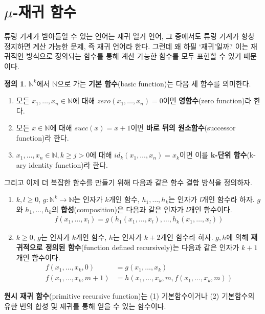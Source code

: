 \documentclass[b5paper, 11pt]{book}
\theoremstyle{definition}
\newtheorem{defn}{정의}[chapter]
\begin{document}
\section{$\mu$-재귀 함수} \label{mu-recursive}
튜링 기계가 받아들일 수 있는 언어는 재귀 열거 언어, 그 중에서도 튜링 기계가 항상 정지하면 계산 가능한 문제, 즉 재귀 언어라 한다. 그런데 왜 하필 `재귀'일까? 이는 재귀적인 방식으로 정의되는 함수를 통해 계산 가능한 함수를 모두 표현할 수 있기 때문이다.  
\begin{defn} \label{primitive recursive definition}
    $\mathbb{N}^k$에서 $\mathbb{N}$으로 가는 \textbf{기본 함수}(basic function)는 다음 세 함수를 의미한다.
    \begin{enumerate}
        \item 모든 $x_1, \ldots, x_n \in \mathbb{N}$에 대해 $zero(x_1, \ldots, x_n) = 0$이면 \textbf{영함수}(zero function)라 한다.
        \item 모든 $x \in \mathbb{N}$에 대해 $succ(x) = x+1$이면 \textbf{바로 뒤의 원소함수}(successor function)라 한다. 
        \item $x_1, \ldots, x_n \in \mathbb{N}, k \ge j > 0$에 대해 $id_k(x_1, \ldots, x_n) = x_k$이면 이를 $\mathbf{k}$\textbf{-단위 함수}(k-ary identity function)라 한다. 
    \end{enumerate}
    그리고 이제 더 복잡한 함수를 만들기 위해 다음과 같은 함수 결합 방식을 정의하자.
    \begin{enumerate}
        \item $k, l \ge 0$, $g: \mathbb{N}^k \rightarrow \mathbb{N}$는 인자가 $k$개인 함수, $h_1, \ldots, h_k$는 인자가 $l$개인 함수라 하자. $g$와 $h_1, \ldots, h_k$의 \textbf{합성}(composition)은 다음과 같은 인자가 $l$개인 함수이다.
        \begin{align*}
            f(x_1, \ldots , x_l) = g(h_1(x_1, \ldots , x_l), \ldots, h_k(x_1, \ldots, x_l))
        \end{align*}
        \item $k \ge 0$, $g$는 인자가 $k$개인 함수, $h$는 인자가 $k+2$개인 함수라 하자. $g, h$에 의해 \textbf{재귀적으로 정의된 함수}(function defined recursively)는 다음과 같은 인자가 $k+1$개인 함수이다.
        \begin{align*}
            f(x_1, \ldots, x_k, 0) &= g(x_1, \ldots, x_k) \\ 
            f(x_1, \ldots, x_k, m+1) &= h(x_1, \ldots, x_k, m, f(x_1, \ldots, x_k, m))
        \end{align*} 
    \end{enumerate}
    \textbf{원시 재귀 함수}(primitive recursive function)는 (1) 기본함수이거나 (2) 기본함수의 유한 번의 합성 및 재귀를 통해 얻을 수 있는 함수이다.
\end{defn}
\end{document}
